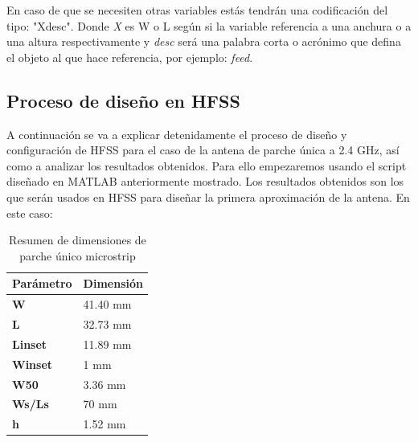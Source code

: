 \par En caso de que se necesiten otras variables estás tendrán una codificación del tipo: "Xdesc". Donde \textit{X} es W o L según si la variable referencia a una anchura o a una altura respectivamente y \textit{desc} será una palabra corta o acrónimo que defina el objeto al que hace referencia, por ejemplo: \textit{feed}.


\subsection{Proceso de diseño en HFSS}
\label{procesodiseno}
\par A continuación se va a explicar detenidamente el proceso de diseño y configuración de HFSS para el caso de la antena de parche única a 2.4 GHz, así como a analizar los resultados obtenidos. Para ello empezaremos usando el script diseñado en MATLAB anteriormente mostrado. Los resultados obtenidos son los que serán usados en HFSS para diseñar la primera aproximación de la antena. En este caso:

\begin{table}[H]
   
   \label{tab:antena1x12}
   \small %
   \centering %
   \begin{tabular}{m{0.2\linewidth}m{0.15\linewidth}} %
   \toprule[\heavyrulewidth]\toprule[\heavyrulewidth]
   \textbf{Parámetro} & \textbf{Dimensión} \\ 
   \midrule
   \textbf{W} & 41.40 mm \\
   \textbf{L} & 32.73 mm \\
   \textbf{Linset} & 11.89 mm \\
   \textbf{Winset} & 1 mm \\
   \textbf{W50} & 3.36 mm \\
   \textbf{Ws/Ls} & 70 mm \\
   \textbf{h} & 1.52 mm \\
   \bottomrule[\heavyrulewidth] 
   \end{tabular}
   \caption{Resumen de dimensiones de parche único microstrip} 
\end{table}

